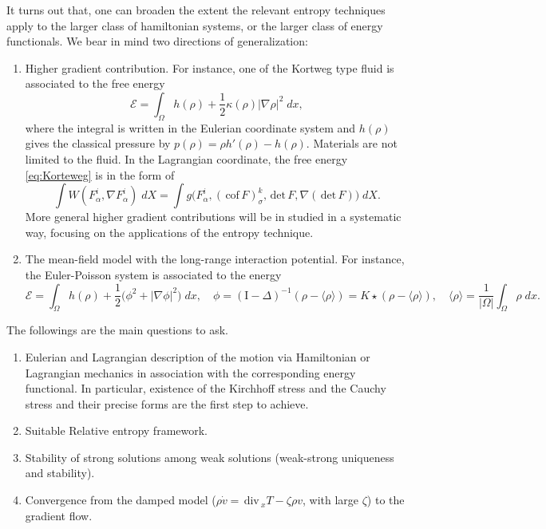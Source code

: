 \documentclass[a4paper,11pt]{article}
\def\div{\,\textrm{div}\,}
\def\cof{\,\textrm{cof}\,}
\def\det{\,\textrm{det}\,}
\def\E{\mathcal{E}}
\begin{document}
It turns out that, one can broaden the extent the relevant entropy techniques apply to the larger class of hamiltonian systems, or the larger class of energy functionals. We bear in mind two directions of generalization:
\begin{enumerate}
 \item Higher gradient contribution. For instance, one of the Kortweg type fluid is associated to the free energy
\begin{equation}
 \E = \int_\Omega h(\rho) + \frac{1}{2}\kappa(\rho) |\nabla \rho|^2 \;dx, \label{eq:Korteweg}
\end{equation}
where the integral is written in the Eulerian coordinate system and $h(\rho)$ gives the classical pressure by $p(\rho) = \rho h'(\rho)- h(\rho)$. Materials are not limited to the fluid. In the Lagrangian coordinate, the free energy \eqref{eq:Korteweg} is in the form of
$$ \int W(F^i_\alpha, \nabla F^i_\alpha) \; dX = \int g\Big(F^i_\alpha, (\cof F)^{k}_\sigma, \det F, \nabla (\det F)\Big) \; dX.$$
More general higher gradient contributions will be in studied in a systematic way, focusing on the applications of the entropy technique.
 \item The mean-field model with the long-range interaction potential. For instance, the Euler-Poisson system is associated to the energy
\begin{equation}
 \E = \int_\Omega h(\rho) + \frac{1}{2} \Big(\phi^2+|\nabla \phi|^2\Big) \;dx, \quad \phi = (\textrm{I}-\Delta)^{-1} (\rho-\langle\rho\rangle)=K\star(\rho-\langle\rho\rangle), \quad \text{$\langle\rho\rangle = \frac{1}{|\Omega|}\int_\Omega \rho \; dx$}. \label{eq:E-P}
\end{equation}
\end{enumerate}

The followings are the main questions to ask.
\begin{enumerate}
 \item Eulerian and Lagrangian description of the motion via Hamiltonian or Lagrangian mechanics in association with the corresponding energy functional. In particular, existence of the Kirchhoff stress and the Cauchy stress and their precise forms are the first step to achieve.
 \item Suitable Relative entropy framework.
 \item Stability of strong solutions among weak solutions (weak-strong uniqueness and stability).
 \item Convergence from the damped model ($\displaystyle \rho\dot{v} = \div_x T - \zeta \rho v$, with large $\zeta$) to the gradient flow.
\end{enumerate}
\end{document}
